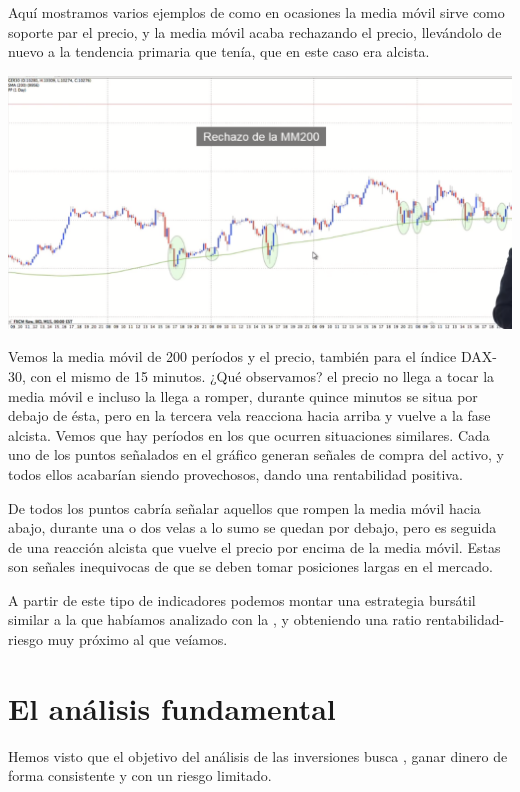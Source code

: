 Aquí mostramos varios ejemplos de como en ocasiones la media móvil sirve como soporte par el precio, y la media móvil acaba rechazando el precio, llevándolo de nuevo a la tendencia primaria que tenía, que en este caso era alcista.
\begin{center}
    \includegraphics[scale=.65]{images/mod03-24.png}
\end{center} 
Vemos la media móvil de 200 períodos y el precio, también para el índice DAX-30, con el mismo  de 15 minutos. ¿Qué observamos? el precio no llega a tocar la media móvil e incluso la llega a romper, durante quince minutos se situa por debajo de ésta, pero en la tercera vela reacciona hacia arriba y vuelve a la fase alcista. Vemos que hay períodos en los que ocurren situaciones similares. Cada uno de los puntos señalados en el gráfico generan señales de compra del activo, y todos ellos acabarían siendo provechosos, dando una rentabilidad positiva. 

De todos los puntos cabría señalar aquellos que rompen la media móvil hacia abajo, durante una o dos velas a lo sumo se quedan por debajo, pero es seguida de una reacción alcista que vuelve el precio por encima de la media móvil. Estas son señales inequivocas de que se deben tomar posiciones largas en el mercado.

A partir de este tipo de indicadores podemos montar una estrategia bursátil similar a la que habíamos analizado con la , y obteniendo una ratio rentabilidad-riesgo muy próximo al que veíamos.

\section{El análisis fundamental}

Hemos visto que el objetivo del análisis de las inversiones busca , ganar dinero de forma consistente y con un riesgo limitado.

